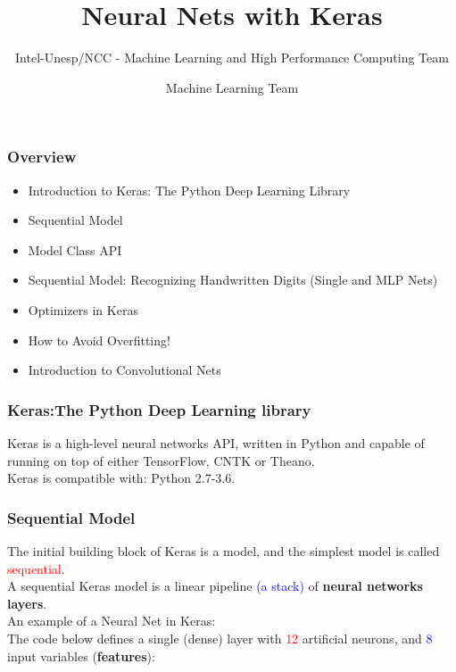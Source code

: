 \documentclass[aspectratio=169]{beamer}
\title[Short title]{Neural Nets with Keras}
\subtitle{Intel-Unesp/NCC - Machine Learning and High Performance Computing Team}
\author{Machine Learning Team}
\begin{document}
\begin{frame}
\titlepage 
\end{frame}

\begin{frame}
\frametitle{Overview} 
\begin{itemize}
\item Introduction to Keras: The Python Deep Learning Library
\item Sequential Model
\item Model Class API
\item Sequential Model: Recognizing Handwritten Digits (Single and MLP Nets)
\item Optimizers in Keras
\item How to Avoid Overfitting!
\item Introduction to Convolutional Nets
\end{itemize}
\end{frame}

\begin{frame}
\frametitle{Keras:The Python Deep Learning library}
Keras is a high-level neural networks API, written in Python and capable of running on top of either TensorFlow, CNTK or Theano.
\\[0.5cm]
Keras is compatible with: Python 2.7-3.6.
\end{frame}

\begin{frame}
\frametitle{Sequential Model}
The initial building block of Keras is a model, and the simplest model is called \textcolor{red}{sequential}. 
\\[0.6cm]
A sequential Keras model is a linear pipeline \textcolor{blue}{(a stack)} of \textbf{neural networks layers}.
\\[0.6cm]
An example of a Neural Net in Keras:
\\[0.3cm]
The code below defines a single (dense) layer with \textcolor{red}{12} artificial neurons, and \textcolor{blue}{8} input variables (\textbf{features}):
\\[0.3cm]
\inputminted{python}{./aux_files/one.py}
\end{frame}
\end{document}
